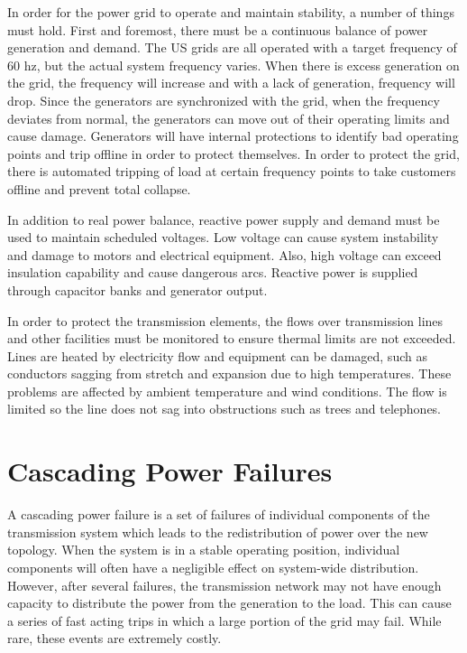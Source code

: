 In order for the power grid to operate and maintain stability, a number of things must hold.  First and foremost, there must be a continuous balance of power generation and demand.  The US grids are all operated with a target frequency of 60 hz, but the actual system frequency varies.  When there is excess generation on the grid, the frequency will increase and with a lack of generation, frequency will drop.  Since the generators are synchronized with the grid, when the frequency deviates from normal, the generators can move out of their operating limits and cause damage.  Generators will have internal protections to identify bad operating points and trip offline in order to protect themselves.  In order to protect the grid, there is automated tripping of load at certain frequency points to take customers offline and prevent total collapse.  

In addition to real power balance, reactive power supply and demand must be used to maintain scheduled voltages.  Low voltage can cause system instability and damage to motors and electrical equipment.  Also, high voltage can exceed insulation capability and cause dangerous arcs.  Reactive power is supplied through capacitor banks and generator output.

In order to protect the transmission elements, the flows over transmission lines and other facilities must be monitored to ensure thermal limits are not exceeded.  Lines are heated by electricity flow and equipment can be damaged, such as conductors sagging from stretch and expansion due to high temperatures.  These problems are affected by ambient temperature and wind conditions.  The flow is limited so the line does not sag into obstructions such as trees and telephones.



\section{Cascading Power Failures}
A cascading power failure is a set of failures of individual components of the transmission system which leads to the redistribution of power over the new topology.
 When the system is in a stable operating position, individual components will often have a negligible effect on system-wide distribution.  However, after several failures, the transmission network may not have enough capacity to distribute the power from the generation to the load.  This can cause a series of fast acting trips in which a large portion of the grid may fail.  While rare, these events are extremely costly.


